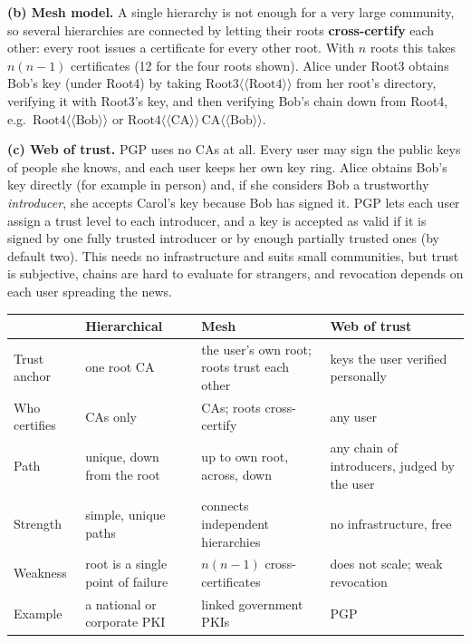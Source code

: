 \textbf{(b) Mesh model.} A single hierarchy is not enough for a very large community, so several hierarchies are connected by letting their roots \textbf{cross-certify} each other: every root issues a certificate for every other root. With $n$ roots this takes $n(n-1)$ certificates (12 for the four roots shown). Alice under Root3 obtains Bob's key (under Root4) by taking $\text{Root3}\langle\!\langle \text{Root4} \rangle\!\rangle$ from her root's directory, verifying it with Root3's key, and then verifying Bob's chain down from Root4, e.g.\ $\text{Root4}\langle\!\langle \text{Bob} \rangle\!\rangle$ or $\text{Root4}\langle\!\langle \text{CA} \rangle\!\rangle\, \text{CA}\langle\!\langle \text{Bob} \rangle\!\rangle$.

\textbf{(c) Web of trust.} PGP uses no CAs at all. Every user may sign the public keys of people she knows, and each user keeps her own key ring. Alice obtains Bob's key directly (for example in person) and, if she considers Bob a trustworthy \emph{introducer}, she accepts Carol's key because Bob has signed it. PGP lets each user assign a trust level to each introducer, and a key is accepted as valid if it is signed by one fully trusted introducer or by enough partially trusted ones (by default two). This needs no infrastructure and suits small communities, but trust is subjective, chains are hard to evaluate for strangers, and revocation depends on each user spreading the news.
\begin{center}\small
\begin{tabularx}{\textwidth}{@{}l>{\raggedright\arraybackslash}X>{\raggedright\arraybackslash}X>{\raggedright\arraybackslash}X@{}}
\toprule
 & Hierarchical & Mesh & Web of trust\\
\midrule
Trust anchor & one root CA & the user's own root; roots trust each other & keys the user verified personally\\
Who certifies & CAs only & CAs; roots cross-certify & any user\\
Path & unique, down from the root & up to own root, across, down & any chain of introducers, judged by the user\\
Strength & simple, unique paths & connects independent hierarchies & no infrastructure, free\\
Weakness & root is a single point of failure & $n(n-1)$ cross-certificates & does not scale; weak revocation\\
Example & a national or corporate PKI & linked government PKIs & PGP\\
\bottomrule
\end{tabularx}
\end{center}

